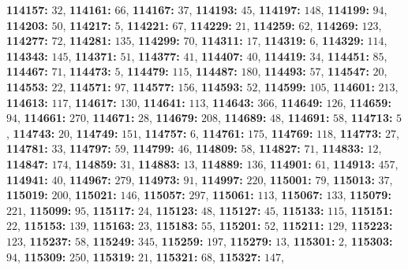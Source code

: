 \textsf{\bfseries 114157:} $32$, \textsf{\bfseries 114161:} $66$, \textsf{\bfseries 114167:} $37$, \textsf{\bfseries 114193:} $45$, \textsf{\bfseries 114197:} $148$, \textsf{\bfseries 114199:} $94$, \textsf{\bfseries 114203:} $50$, \textsf{\bfseries 114217:} $5$, \textsf{\bfseries 114221:} $67$, \textsf{\bfseries 114229:} $21$, \textsf{\bfseries 114259:} $62$, \textsf{\bfseries 114269:} $123$, \textsf{\bfseries 114277:} $72$, \textsf{\bfseries 114281:} $135$, \textsf{\bfseries 114299:} $70$, \textsf{\bfseries 114311:} $17$, \textsf{\bfseries 114319:} $6$, \textsf{\bfseries 114329:} $114$, \textsf{\bfseries 114343:} $145$, \textsf{\bfseries 114371:} $51$, \textsf{\bfseries 114377:} $41$, \textsf{\bfseries 114407:} $40$, \textsf{\bfseries 114419:} $34$, \textsf{\bfseries 114451:} $85$, \textsf{\bfseries 114467:} $71$, \textsf{\bfseries 114473:} $5$, \textsf{\bfseries 114479:} $115$, \textsf{\bfseries 114487:} $180$, \textsf{\bfseries 114493:} $57$, \textsf{\bfseries 114547:} $20$, \textsf{\bfseries 114553:} $22$, \textsf{\bfseries 114571:} $97$, \textsf{\bfseries 114577:} $156$, \textsf{\bfseries 114593:} $52$, \textsf{\bfseries 114599:} $105$, \textsf{\bfseries 114601:} $213$, \textsf{\bfseries 114613:} $117$, \textsf{\bfseries 114617:} $130$, \textsf{\bfseries 114641:} $113$, \textsf{\bfseries 114643:} $366$, \textsf{\bfseries 114649:} $126$, \textsf{\bfseries 114659:} $94$, \textsf{\bfseries 114661:} $270$, \textsf{\bfseries 114671:} $28$, \textsf{\bfseries 114679:} $208$, \textsf{\bfseries 114689:} $48$, \textsf{\bfseries 114691:} $58$, \textsf{\bfseries 114713:} $5$, \textsf{\bfseries 114743:} $20$, \textsf{\bfseries 114749:} $151$, \textsf{\bfseries 114757:} $6$, \textsf{\bfseries 114761:} $175$, \textsf{\bfseries 114769:} $118$, \textsf{\bfseries 114773:} $27$, \textsf{\bfseries 114781:} $33$, \textsf{\bfseries 114797:} $59$, \textsf{\bfseries 114799:} $46$, \textsf{\bfseries 114809:} $58$, \textsf{\bfseries 114827:} $71$, \textsf{\bfseries 114833:} $12$, \textsf{\bfseries 114847:} $174$, \textsf{\bfseries 114859:} $31$, \textsf{\bfseries 114883:} $13$, \textsf{\bfseries 114889:} $136$, \textsf{\bfseries 114901:} $61$, \textsf{\bfseries 114913:} $457$, \textsf{\bfseries 114941:} $40$, \textsf{\bfseries 114967:} $279$, \textsf{\bfseries 114973:} $91$, \textsf{\bfseries 114997:} $220$, \textsf{\bfseries 115001:} $79$, \textsf{\bfseries 115013:} $37$, \textsf{\bfseries 115019:} $200$, \textsf{\bfseries 115021:} $146$, \textsf{\bfseries 115057:} $297$, \textsf{\bfseries 115061:} $113$, \textsf{\bfseries 115067:} $133$, \textsf{\bfseries 115079:} $221$, \textsf{\bfseries 115099:} $95$, \textsf{\bfseries 115117:} $24$, \textsf{\bfseries 115123:} $48$, \textsf{\bfseries 115127:} $45$, \textsf{\bfseries 115133:} $115$, \textsf{\bfseries 115151:} $22$, \textsf{\bfseries 115153:} $139$, \textsf{\bfseries 115163:} $23$, \textsf{\bfseries 115183:} $55$, \textsf{\bfseries 115201:} $52$, \textsf{\bfseries 115211:} $129$, \textsf{\bfseries 115223:} $123$, \textsf{\bfseries 115237:} $58$, \textsf{\bfseries 115249:} $345$, \textsf{\bfseries 115259:} $197$, \textsf{\bfseries 115279:} $13$, \textsf{\bfseries 115301:} $2$, \textsf{\bfseries 115303:} $94$, \textsf{\bfseries 115309:} $250$, \textsf{\bfseries 115319:} $21$, \textsf{\bfseries 115321:} $68$, \textsf{\bfseries 115327:} $147$, 
